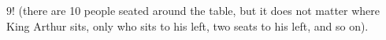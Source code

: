 \documentclass[10pt]{exam}
\begin{document}
\begin{questions}


\question %

\question $9!$ (there are 10 people seated around the table, but it does not matter where King Arthur sits, only who sits to his left, two seats to his left, and so on).  %
\end{questions}
\end{document}
